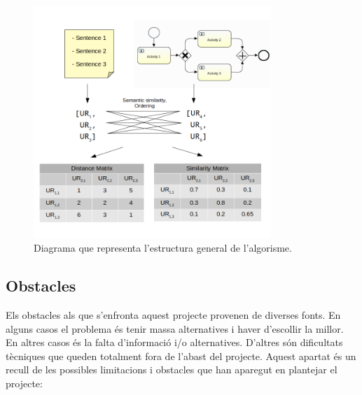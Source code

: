 \begin{figure}
    \centering
    \includegraphics[width=0.8\textwidth]{figures/estructura_projecte.png}
    \caption{Diagrama que representa l'estructura general de l'algorisme.}
    \label{fig:estructura_projecte}
\end{figure}

\subsection{Obstacles}
\label{sec:introduccio-abast-obstacles}
Els obstacles als que s'enfronta aquest projecte provenen de diverses fonts. En alguns casos el problema és tenir massa alternatives i haver d'escollir la millor. En altres casos és la falta d'informació i/o alternatives. D'altres són dificultats tècniques que queden totalment fora de l'abast del projecte. Aquest apartat és un recull de les possibles limitacions i obstacles que han aparegut en plantejar el projecte:

